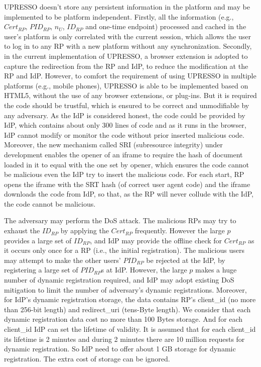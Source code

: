 UPRESSO doesn't store any persistent information in the platform and may be implemented to be platform independent. Firstly, all the information (e.g., $Cert_{RP}$, $PID_{RP}$, $n_U$, $ID_{RP}$ and one-time endpoint) processed and cached in the user's platform is only correlated with the current session, which allows the user to log in to any RP with a new platform without any synchronization. Secondly, in the current implementation of UPRESSO, a browser extension is adopted to capture the redirection from the RP and IdP, to reduce the modification at the RP and IdP.
However, to comfort the requirement of using UPRESSO in multiple platforms (e.g., mobile phones), UPRESSO is able to be implemented based on HTML5, without the use of any browser extensions, or plug-ins. But it is required the code should be trustful, which is ensured to be correct and unmodifiable by any adversary. As the IdP is considered honest, the code could be provided by IdP, which contains about only 300 lines of code and as it runs in the browser, IdP cannot modify or monitor the code without prior inserted malicious code. Moreover, the new mechanism called SRI (subresource integrity) under development enables the opener of an iframe to require the hash of document loaded in it to equal with the one set by opener, which ensures the code cannot be malicious even the IdP try to insert the malicious code. For each start, RP opens the iframe with the SRT hash (of correct user agent code) and the iframe downloads the code from IdP, so that, as the RP will never collude with the IdP, the code cannot be malicious.

 The adversary may perform the DoS attack. The malicious RPs may try to exhaust the $ID_{RP}$  by applying the $Cert_{RP}$ frequently. However the large $p$ provides a large set of $ID_{RP}$, and IdP may provide the offline check for $Cert_{RP}$ as it occurs only once for a RP (i.e., the initial registration). The malicious users may attempt to make the other users' $PID_{RP}$ be rejected at the IdP, by registering a large set of $PID_{RP}$s at IdP. However, the large $p$ makes a huge number of dynamic registration required, and IdP may adopt existing DoS mitigation to limit the number of adversary's dynamic registrations. Moreover, for IdP's dynamic registration storage, the data contains RP's client\_id (no more than 256-bit length) and redirect\_uri (tens-Byte length). We consider that each dynamic registration data cost no more than 100 Bytes storage. And for each client\_id IdP can set the lifetime of validity. It is assumed that for each client\_id its lifetime is 2 minutes and during 2 minutes there are 10 million requests for dynamic registration. So IdP need to offer about 1 GB storage for dynamic registration. The extra cost of storage can be ignored.




